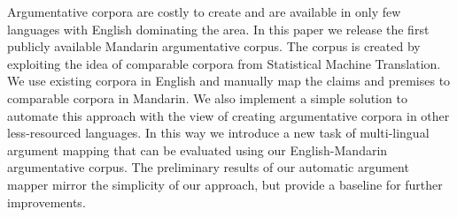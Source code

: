 Argumentative corpora are costly to create and are available in only few languages with English dominating the area. In this paper we release the first publicly available Mandarin argumentative corpus. The corpus is created by exploiting the idea of comparable corpora from Statistical Machine Translation. We use existing corpora in English and manually map the claims and premises to comparable corpora in Mandarin. We also implement a simple solution to automate this approach with the view of creating argumentative corpora in other less-resourced languages. In this way we introduce a new task of multi-lingual argument mapping that can be evaluated using our English-Mandarin argumentative corpus. The preliminary results of our automatic argument mapper mirror the simplicity of our approach, but provide a baseline for further improvements.
